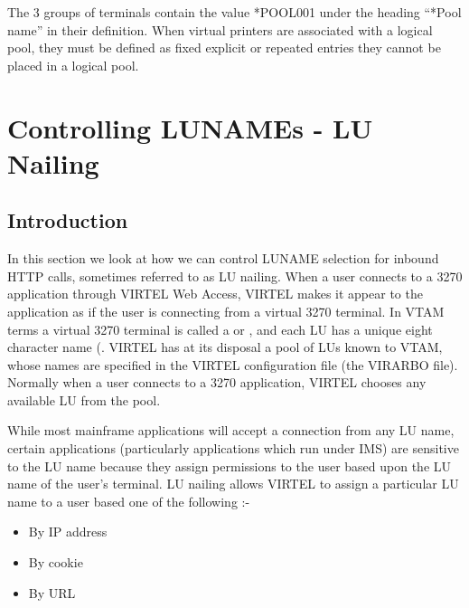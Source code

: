 \documentclass[letterpaper,10pt,english]{sphinxmanual}
\begin{document}
The 3 groups of terminals contain the value *POOL001 under the heading “*Pool name” in their definition. When virtual printers are associated with a logical pool, they must be defined as fixed explicit or repeated entries \textendash{} they cannot be placed in a logical pool.

\ignorespaces 

\chapter{Controlling LUNAMEs - LU Nailing}
\label{\detokenize{connectivity_guide:controlling-lunames-lu-nailing}}\label{\detokenize{connectivity_guide:v461cn-forceluname}}\label{\detokenize{connectivity_guide:index-149}}

\section{Introduction}
\label{\detokenize{connectivity_guide:id72}}
In this section we look at how we can control LUNAME selection for inbound HTTP calls, sometimes referred to as LU nailing. When a user connects to a 3270 application through VIRTEL Web Access, VIRTEL makes it appear to the application as if the user is connecting from a virtual 3270 terminal. In VTAM terms a virtual 3270 terminal is called a  or , and each LU has a unique eight character name (. VIRTEL has at its disposal a pool of LUs known to VTAM, whose names are specified in the VIRTEL configuration file (the VIRARBO file). Normally when a user connects to a 3270 application, VIRTEL chooses any available LU from the pool.

While most mainframe applications will accept a connection from any LU name, certain applications (particularly applications which run under IMS) are sensitive to the LU name because they assign permissions to the user based upon the LU name of the user’s terminal. LU nailing allows VIRTEL to assign a particular LU name to a user based one of the following :-
\begin{itemize}
\item {} 
By IP address

\item {} 
By cookie

\item {} 
By URL

\end{itemize}
\end{document}
